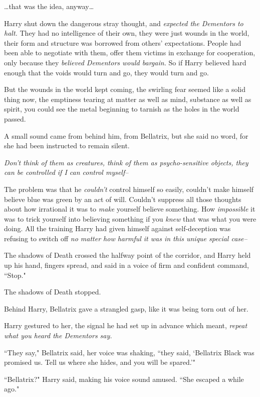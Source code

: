 {\ldots}that was the idea, anyway{\ldots}

Harry shut down the dangerous stray thought, and \emph{expected the Dementors to halt.} They had no intelligence of their own, they were just wounds in the world, their form and structure was borrowed from others' expectations. People had been able to negotiate with them, offer them victims in exchange for cooperation, only because they \emph{believed Dementors would bargain.} So if Harry believed hard enough that the voids would turn and go, they would turn and go.

But the wounds in the world kept coming, the swirling fear seemed like a solid thing now, the emptiness tearing at matter as well as mind, substance as well as spirit, you could see the metal beginning to tarnish as the holes in the world passed.

A small sound came from behind him, from Bellatrix, but she said no word, for she had been instructed to remain silent.

\emph{Don't think of them as creatures, think of them as psycho-sensitive objects, they can be controlled if I can control myself\---}

The problem was that he \emph{couldn't} control himself so easily, couldn't make himself believe blue was green by an act of will. Couldn't suppress all those thoughts about how irrational it was to \emph{make} yourself believe something. How \emph{impossible} it was to trick yourself into believing something if you \emph{knew} that was what you were doing. All the training Harry had given himself against self-deception was refusing to switch off \emph{no matter how harmful it was in this unique special case\---}

The shadows of Death crossed the halfway point of the corridor, and Harry held up his hand, fingers spread, and said in a voice of firm and confident command, ``Stop."

The shadows of Death stopped.

Behind Harry, Bellatrix gave a strangled gasp, like it was being torn out of her.

Harry gestured to her, the signal he had set up in advance which meant, \emph{repeat what you heard the Dementors say.}

``They say," Bellatrix said, her voice was shaking, ``they said, `Bellatrix Black was promised us. Tell us where she hides, and you will be spared.'"

``Bellatrix?" Harry said, making his voice sound amused. ``She escaped a while ago."

